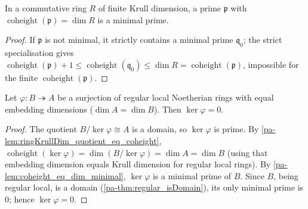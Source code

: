 \begin{lemma}
  \label{pa-lem:coheight_eq_dim_minimal}
  \leanok

  In a commutative ring \(R\) of finite Krull dimension, a prime \(\mathfrak p\)
  with \(\operatorname{coheight}(\mathfrak p) = \dim R\) is a minimal prime.
\end{lemma}
\begin{proof}
  \leanok
  If \(\mathfrak p\) is not minimal, it strictly contains a minimal prime
  \(\mathfrak q_0\); the strict specialisation gives
  \(\operatorname{coheight}(\mathfrak p) + 1 \le \operatorname{coheight}(\mathfrak q_0)
  \le \dim R = \operatorname{coheight}(\mathfrak p)\), impossible for the finite
  \(\operatorname{coheight}(\mathfrak p)\).
\end{proof}

\begin{lemma}
  \label{pa-lem:ker_eq_bot_equal_dim}
  \leanok

  Let \(\varphi : B \twoheadrightarrow A\) be a surjection of regular local
  Noetherian rings with equal embedding dimensions
  (\(\dim A = \dim B\)). Then \(\ker \varphi = 0\).
\end{lemma}
\begin{proof}
  \leanok
  The quotient \(B/\ker\varphi \cong A\) is a domain, so \(\ker\varphi\) is
  prime. By \ref{pa-lem:ringKrullDim_quotient_eq_coheight},
  \(\operatorname{coheight}(\ker\varphi) = \dim(B/\ker\varphi) = \dim A = \dim B\)
  (using that embedding dimension equals Krull dimension for regular local
  rings). By \ref{pa-lem:coheight_eq_dim_minimal}, \(\ker\varphi\) is a minimal
  prime of \(B\). Since \(B\), being regular local, is a domain
  (\ref{pa-thm:regular_isDomain}), its only minimal prime is \(0\); hence
  \(\ker\varphi = 0\).
\end{proof}

